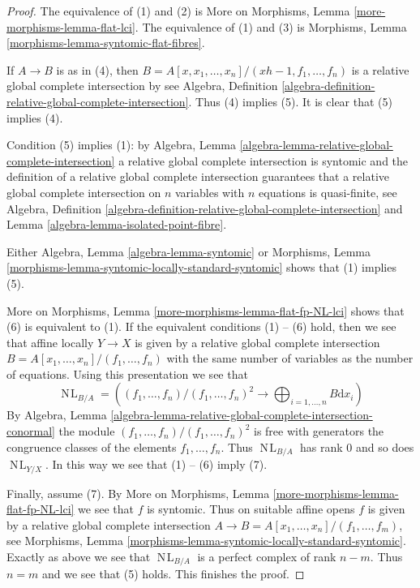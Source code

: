 \documentclass[10pt,a4paper]{amsart}
\theoremstyle{plain}
\theoremstyle{definition}
\theoremstyle{remark}
\numberwithin{equation}{subsection}
\def\NL{\mathop{N\!L}\nolimits}
\begin{document}
\begin{proof}
The equivalence of (1) and (2) is
More on Morphisms, Lemma \ref{more-morphisms-lemma-flat-lci}.
The equivalence of (1) and (3) is 
Morphisms, Lemma \ref{morphisms-lemma-syntomic-flat-fibres}.

\medskip\noindent
If $A \to B$ is as in (4), then
$B = A[x, x_1, \ldots, x_n]/(xh - 1, f_1, \ldots, f_n)$
is a relative global complete intersection by see Algebra, Definition
\ref{algebra-definition-relative-global-complete-intersection}.
Thus (4) implies (5).
It is clear that (5) implies (4).

\medskip\noindent
Condition (5) implies (1): by
Algebra, Lemma \ref{algebra-lemma-relative-global-complete-intersection}
a relative global complete intersection is syntomic and
the definition of a relative global complete intersection
guarantees that a relative global complete intersection on
$n$ variables with $n$ equations is quasi-finite, see
Algebra, Definition
\ref{algebra-definition-relative-global-complete-intersection} and
Lemma \ref{algebra-lemma-isolated-point-fibre}.

\medskip\noindent
Either Algebra, Lemma \ref{algebra-lemma-syntomic} or
Morphisms, Lemma \ref{morphisms-lemma-syntomic-locally-standard-syntomic}
shows that (1) implies (5).

\medskip\noindent
More on Morphisms, Lemma \ref{more-morphisms-lemma-flat-fp-NL-lci} shows that
(6) is equivalent to (1). If the equivalent conditions (1) -- (6) hold,
then we see that affine locally $Y \to X$ is given by a relative global
complete intersection $B = A[x_1, \ldots, x_n]/(f_1, \ldots, f_n)$
with the same number of variables as the number of
equations. Using this presentation we see that
$$
\NL_{B/A} =\left(
(f_1, \ldots, f_n)/(f_1, \ldots, f_n)^2
\longrightarrow
\bigoplus\nolimits_{i = 1, \ldots, n} B \text{d} x_i\right)
$$
By Algebra, Lemma
\ref{algebra-lemma-relative-global-complete-intersection-conormal}
the module $(f_1, \ldots, f_n)/(f_1, \ldots, f_n)^2$
is free with generators the congruence classes of the elements
$f_1, \ldots, f_n$. Thus $\NL_{B/A}$ has rank $0$ and so does $\NL_{Y/X}$.
In this way we see that (1) -- (6) imply (7).

\medskip\noindent
Finally, assume (7). By
More on Morphisms, Lemma \ref{more-morphisms-lemma-flat-fp-NL-lci}
we see that $f$ is syntomic. Thus on suitable affine opens
$f$ is given by a relative global complete intersection
$A \to B = A[x_1, \ldots, x_n]/(f_1, \ldots, f_m)$, see
Morphisms, Lemma \ref{morphisms-lemma-syntomic-locally-standard-syntomic}.
Exactly as above we see that $\NL_{B/A}$ is a perfect complex
of rank $n - m$. Thus $n = m$ and we see that (5) holds.
This finishes the proof.
\end{proof}
\end{document}
